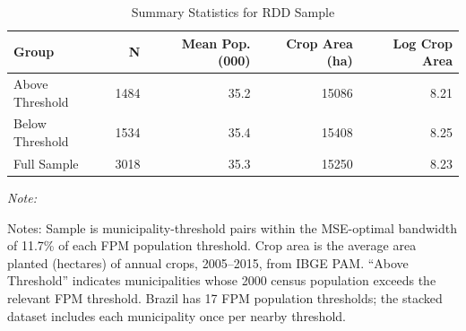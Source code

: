 \begin{table}
\centering
\caption{\label{tab:tab1_summary}Summary Statistics for RDD Sample}
\centering
\fontsize{10}{12}\selectfont
\begin{threeparttable}
\begin{tabular}[t]{lrrrr}
\toprule
Group & N & Mean Pop. (000) & Crop Area (ha) & Log Crop Area\\
\midrule
Above Threshold & 1484 & 35.2 & 15086 & 8.21\\
Below Threshold & 1534 & 35.4 & 15408 & 8.25\\
Full Sample & 3018 & 35.3 & 15250 & 8.23\\
\bottomrule
\end{tabular}
\begin{tablenotes}
\item \textit{Note: } 
\item Notes: Sample is municipality-threshold pairs within the MSE-optimal bandwidth of 11.7\% of each FPM population threshold. Crop area is the average area planted (hectares) of annual crops, 2005--2015, from IBGE PAM. ``Above Threshold'' indicates municipalities whose 2000 census population exceeds the relevant FPM threshold. Brazil has 17 FPM population thresholds; the stacked dataset includes each municipality once per nearby threshold.
\end{tablenotes}
\end{threeparttable}
\end{table}

